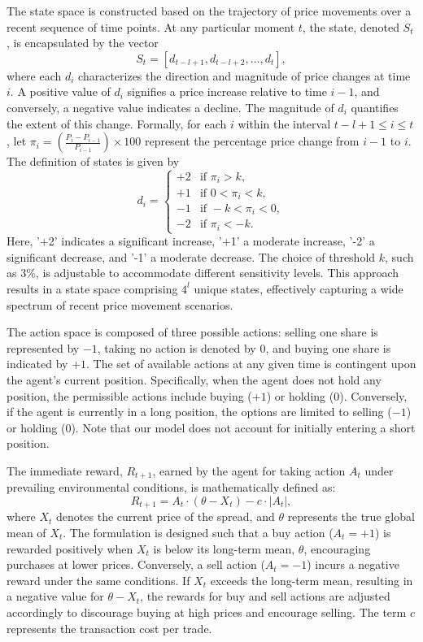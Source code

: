\documentclass{article}
\begin{document}
The state space is constructed based on the trajectory of price movements over a recent sequence of time points. At any particular moment \(t\), the state, denoted \(S_t\), is encapsulated by the vector
\[
S_t = [d_{t-l+1}, d_{t-l+2}, \ldots, d_{t}],
\]
where each \(d_{i}\) characterizes the direction and magnitude of price changes at time \(i\). A positive value of \(d_{i}\) signifies a price increase relative to time \(i-1\), and conversely, a negative value indicates a decline. The magnitude of \(d_{i}\) quantifies the extent of this change. Formally, for each \(i\) within the interval \(t-l+1 \leq i \leq t\), let \(\pi_i = \left( \frac{P_i - P_{i-1}}{P_{i-1}} \right) \times 100\) represent the percentage price change from \(i-1\) to \(i\). The definition of states is given by
\[
  d_i = 
  \begin{cases} 
    +2 & \text{if } \pi_i > k, \\
    +1 & \text{if } 0 < \pi_i < k, \\
    -1 & \text{if } -k < \pi_i < 0, \\
    -2 & \text{if } \pi_i < -k.
  \end{cases}
\]
Here, '+2' indicates a significant increase, '+1' a moderate increase, '-2' a significant decrease, and '-1' a moderate decrease. The choice of threshold \(k\), such as 3\%, is adjustable to accommodate different sensitivity levels. This approach results in a state space comprising \(4^l\) unique states, effectively capturing a wide spectrum of recent price movement scenarios.


The action space is composed of three possible actions: selling one share is represented by $-1$, taking no action is denoted by $0$, and buying one share is indicated by $+1$. The set of available actions at any given time is contingent upon the agent's current position. Specifically, when the agent does not hold any position, the permissible actions include buying ($+1$) or holding ($0$). Conversely, if the agent is currently in a long position, the options are limited to selling ($-1$) or holding ($0$). Note that our model does not account for initially entering a short position.

The immediate reward, $R_{t+1}$, earned by the agent for taking action $A_t$ under prevailing environmental conditions, is mathematically defined as:
\begin{equation}\label{equ7}
    R_{t+1} = A_t \cdot (\theta - X_t) - c \cdot |A_t|,
\end{equation}
where $X_t$ denotes the current price of the spread, and $\theta$ represents the true global mean of $X_t$. The formulation is designed such that a buy action ($A_t = +1$) is rewarded positively when $X_t$ is below its long-term mean, $\theta$, encouraging purchases at lower prices. Conversely, a sell action ($A_t = -1$) incurs a negative reward under the same conditions. If $X_t$ exceeds the long-term mean, resulting in a negative value for $\theta - X_t$, the rewards for buy and sell actions are adjusted accordingly to discourage buying at high prices and encourage selling. The term $c$ represents the transaction cost per trade.
\end{document}
